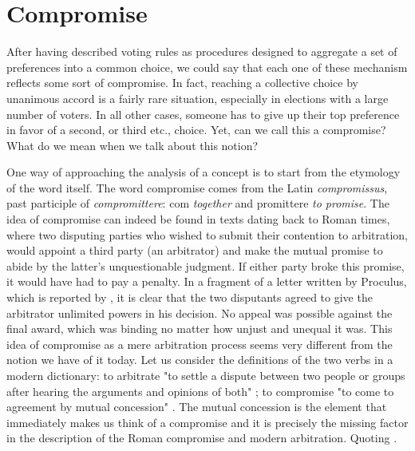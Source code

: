 
\section{Compromise}

After having described voting rules as procedures designed to aggregate a set of preferences into a common choice, we could say that each one of these mechanism reflects some sort of compromise. In fact, reaching a collective choice by unanimous accord is a fairly rare situation, especially in elections with a large number of voters. In all other cases, someone has to give up their top preference in favor of a second, or third etc., choice. Yet, can we call this a compromise? What do we mean when we talk about this notion?

One way of approaching the analysis of a concept is to start from the etymology of the word itself. The word compromise comes from the Latin \textit{compromissus}, past participle of \textit{compromittere}: com \textit{together} and promittere \textit{to promise}.
The idea of compromise can indeed be found in texts dating back to Roman times, where two disputing parties who wished to submit their contention to arbitration, would appoint a third party (an arbitrator) and make the mutual promise to abide by the latter's unquestionable judgment. If either party broke this promise, it would have had to pay a penalty.
In a fragment of a letter written by Proculus, which is reported by \citet[p.529]{Zimmermann1996}, it is clear that the two disputants agreed to give the arbitrator unlimited powers in his decision. No appeal was possible against the final award, which was binding no matter how unjust and unequal it was. This idea of compromise as a mere arbitration process seems very different from the notion we have of it today. Let us consider the definitions of the two verbs in a modern dictionary: to arbitrate "to settle a dispute between two people or groups after hearing the arguments and opinions of both" \citep{Arbitration}; to compromise "to come to agreement by mutual concession" \citep{Compromise}.
The mutual concession is the element that immediately makes us think of a compromise and it is precisely the missing factor in the description of the Roman compromise and modern arbitration. Quoting \citet{Braybrooke1982} .

